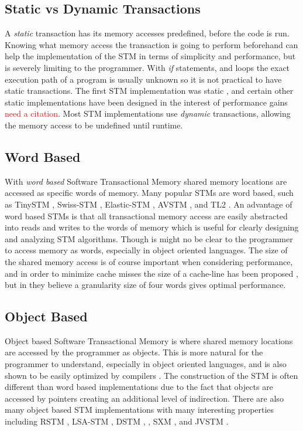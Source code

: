 \subsection{Static vs Dynamic Transactions}
A \emph{static} transaction has its memory accesses predefined, before the code is run.
Knowing what memory access the transaction is going to perform beforehand can help the implementation of the STM in terms of simplicity and performance, but is severely limiting to the programmer.
With \emph{if} statements, and loops the exact execution path of a program is usually unknown so it is not practical to have static transactions.
The first STM implementation was static \cite{224987}, and certain other static implementations have been designed in the interest of performance gains \textcolor{Red}{need a citation}.
Most STM implementations use \emph{dynamic} transactions, allowing the memory access to be undefined until runtime.

\subsection{Word Based}
With \emph{word based} Software Transactional Memory shared memory locations are accessed as specific words of memory.  Many popular STMs are word based, such as TinySTM \cite{10.1109/TPDS.2010.49}, Swiss-STM \cite{1542494}, Elastic-STM \cite{LPD-REPORT-2009-002}, AVSTM \cite{LPD-CONF-2008-031}, and TL2 \cite{Dice06transactionallocking}.
An advantage of word based STMs is that all transactional memory access are easily abstracted into reads and writes to the words of memory which is useful for clearly designing and analyzing STM algorithms.
Though is might no be clear to the programmer to access memory as words, especially in object oriented languages.
The size of the shared memory access is of course important when considering performance, and in order to minimize cache misses the size of a cache-line has been proposed \cite{1123001}, but in \cite{1542494} they believe a granularity size of four words gives optimal performance.

\subsection{Object Based}
Object based Software Transactional Memory is where shared memory locations are accessed by the programmer as objects.  This is more natural for the programmer to understand, especially in object oriented languages, and is also shown to be easily optimized by compilers \cite{1133985}.
The construction of the STM is often different than word based implementations due to the fact that objects are accessed by pointers creating an additional level of indirection.  There are also many object based STM implementations with many interesting properties including RSTM \cite{Marathe06loweringthe}, LSA-STM \cite{10.1109/TPDS.2010.49}, DSTM \cite{872048},  \cite{Ennals05efficientsoftware}, SXM \cite{guerraoui05polymorphic/LPD}, and JVSTM \cite{1228566}.

